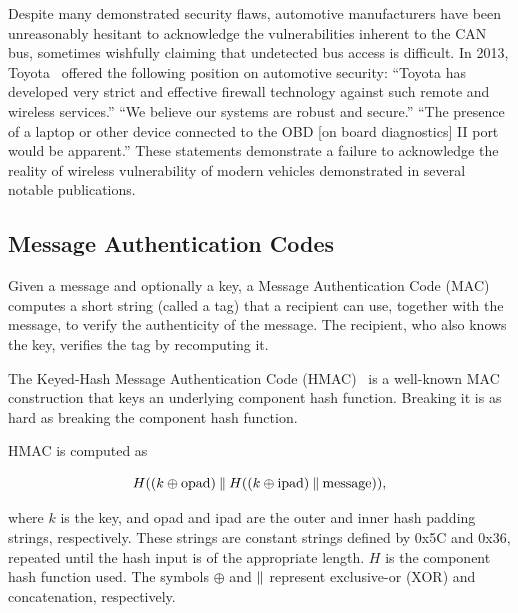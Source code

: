 Despite many demonstrated security flaws, automotive 
manufacturers have been unreasonably hesitant to acknowledge the vulnerabilities inherent to the CAN bus,
sometimes wishfully claiming that undetected bus access is difficult. 
In 2013, Toyota~\cite{bbc_toyota} offered the following position on automotive security: 
``Toyota has developed very strict and effective firewall technology against such remote and wireless services.'' 
``We believe our systems are robust and secure.'' 
``The presence of a laptop or other device connected to the OBD [on board diagnostics] II port would be apparent.'' 
These statements demonstrate a failure to acknowledge the 
reality of wireless vulnerability of modern vehicles demonstrated in several notable publications.

\subsection{Message Authentication Codes}

Given a message and optionally a key, a Message Authentication Code (MAC) computes a short string (called a tag) 
that a recipient can use, together with the message, to verify the authenticity of the message.  
The recipient, who also knows the key, 
verifies the tag by recomputing it.

The Keyed-Hash Message Authentication Code (HMAC)~\cite{HMAC,FIPS-198-1} 
is a well-known MAC construction that keys an underlying component hash function.  
Breaking it is as hard as breaking the component hash function.

HMAC is computed as

\begin{equation}
H((k\oplus \text{opad})\mathbin{\|} H((k\oplus \text{ipad})\mathbin{\|} \text{message})) ,
\end{equation}

\noindent
where $k$ is the key, and opad and ipad are the outer and inner hash padding strings, respectively. 
These strings are constant strings defined by 0x5C and 0x36, repeated until the hash input is of the appropriate length. 
$H$ is the component hash function used. 
The symbols $\oplus$ and $\mathbin{\|}$ represent exclusive-or (XOR) and concatenation, respectively.





